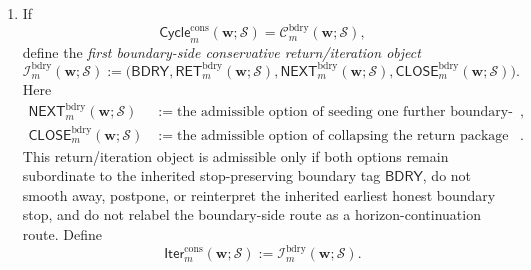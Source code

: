 \begin{definition}
\begin{enumerate}[label=(\roman*)]
  \item If
  \[
    \mathsf{Cycle}^{\mathrm{cons}}_{m}(\mathbf w;\mathcal S)
    =
    \mathcal C^{\mathrm{bdry}}_{m}(\mathbf w;\mathcal S),
  \]
define the \emph{first boundary-side conservative return/iteration object}
\[
  \mathcal I^{\mathrm{bdry}}_{m}(\mathbf w;\mathcal S)
  :=
  \bigl(
    \mathsf{BDRY},
    \mathsf{RET}^{\mathrm{bdry}}_{m}(\mathbf w;\mathcal S),
    \mathsf{NEXT}^{\mathrm{bdry}}_{m}(\mathbf w;\mathcal S),
    \mathsf{CLOSE}^{\mathrm{bdry}}_{m}(\mathbf w;\mathcal S)
  \bigr).
\]
Here
\begin{align*}
  \mathsf{NEXT}^{\mathrm{bdry}}_{m}(\mathbf w;\mathcal S)
  &:= \text{the admissible option of seeding one further boundary-side conservative cycle subordinate to the inherited stop-preserving boundary tag},\\
  \mathsf{CLOSE}^{\mathrm{bdry}}_{m}(\mathbf w;\mathcal S)
  &:= \text{the admissible option of collapsing the return package into one compact boundary-side conservative comparison/closing object subordinate to the inherited earliest honest boundary stop}.
\end{align*}
This return/iteration object is admissible only if both options remain subordinate to the inherited stop-preserving boundary tag \(\mathsf{BDRY}\), do not smooth away, postpone, or reinterpret the inherited earliest honest boundary stop, and do not relabel the boundary-side route as a horizon-continuation route. Define
\[
  \mathsf{Iter}^{\mathrm{cons}}_{m}(\mathbf w;\mathcal S)
  :=
  \mathcal I^{\mathrm{bdry}}_{m}(\mathbf w;\mathcal S).
\]
\end{enumerate}
\end{definition}

